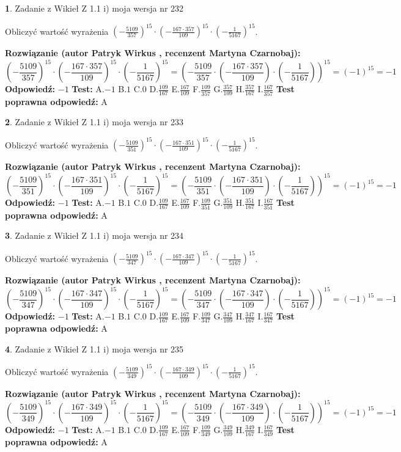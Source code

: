 \documentclass[12pt, a4paper]{article}
\theoremstyle{definition} %
\newtheorem{zad}{}
\newcommand{\zadStart}[1]{\begin{zad}#1\newline}
\newcommand{\zadStop}{\end{zad}}
\newcommand{\rozwStart}[2]{\noindent \textbf{Rozwiązanie (autor #1 , recenzent #2): }\newline}
\newcommand{\rozwStop}{\newline}
\newcommand{\odpStart}{\noindent \textbf{Odpowiedź:}\newline}
\newcommand{\odpStop}{\newline}
\newcommand{\testStart}{\noindent \textbf{Test:}\newline}
\newcommand{\testStop}{\newline}
\newcommand{\kluczStart}{\noindent \textbf{Test poprawna odpowiedź:}\newline}
\newcommand{\kluczStop}{\newline}
\begin{document}
\zadStart{Zadanie z Wikieł Z 1.1 i) moja wersja nr 232}

Obliczyć wartość wyrażenia $(-\frac{5109}{357})^{15} \cdot (-\frac{167 \cdot 357}{109})^{15} \cdot (-\frac{1}{5167})^{15}$.
\zadStop
\rozwStart{Patryk Wirkus}{Martyna Czarnobaj}
$$(-\frac{5109}{357})^{15} \cdot (-\frac{167 \cdot 357}{109})^{15} \cdot (-\frac{1}{5167})^{15} = (-\frac{5109}{357} \cdot (-\frac{167 \cdot 357}{109}) \cdot (-\frac{1}{5167}))^{15} = (-1)^{15} = -1$$
\rozwStop
\odpStart
$-1$
\odpStop
\testStart
A.$-1$ B.$1$ C.$0$ D.$\frac{109}{167}$ E.$\frac{167}{109}$
F.$\frac{109}{357}$ G.$\frac{357}{109}$
H.$\frac{357}{167}$
I.$\frac{167}{357}$
\testStop
\kluczStart
A
\kluczStop



\zadStart{Zadanie z Wikieł Z 1.1 i) moja wersja nr 233}

Obliczyć wartość wyrażenia $(-\frac{5109}{351})^{15} \cdot (-\frac{167 \cdot 351}{109})^{15} \cdot (-\frac{1}{5167})^{15}$.
\zadStop
\rozwStart{Patryk Wirkus}{Martyna Czarnobaj}
$$(-\frac{5109}{351})^{15} \cdot (-\frac{167 \cdot 351}{109})^{15} \cdot (-\frac{1}{5167})^{15} = (-\frac{5109}{351} \cdot (-\frac{167 \cdot 351}{109}) \cdot (-\frac{1}{5167}))^{15} = (-1)^{15} = -1$$
\rozwStop
\odpStart
$-1$
\odpStop
\testStart
A.$-1$ B.$1$ C.$0$ D.$\frac{109}{167}$ E.$\frac{167}{109}$
F.$\frac{109}{351}$ G.$\frac{351}{109}$
H.$\frac{351}{167}$
I.$\frac{167}{351}$
\testStop
\kluczStart
A
\kluczStop



\zadStart{Zadanie z Wikieł Z 1.1 i) moja wersja nr 234}

Obliczyć wartość wyrażenia $(-\frac{5109}{347})^{15} \cdot (-\frac{167 \cdot 347}{109})^{15} \cdot (-\frac{1}{5167})^{15}$.
\zadStop
\rozwStart{Patryk Wirkus}{Martyna Czarnobaj}
$$(-\frac{5109}{347})^{15} \cdot (-\frac{167 \cdot 347}{109})^{15} \cdot (-\frac{1}{5167})^{15} = (-\frac{5109}{347} \cdot (-\frac{167 \cdot 347}{109}) \cdot (-\frac{1}{5167}))^{15} = (-1)^{15} = -1$$
\rozwStop
\odpStart
$-1$
\odpStop
\testStart
A.$-1$ B.$1$ C.$0$ D.$\frac{109}{167}$ E.$\frac{167}{109}$
F.$\frac{109}{347}$ G.$\frac{347}{109}$
H.$\frac{347}{167}$
I.$\frac{167}{347}$
\testStop
\kluczStart
A
\kluczStop



\zadStart{Zadanie z Wikieł Z 1.1 i) moja wersja nr 235}

Obliczyć wartość wyrażenia $(-\frac{5109}{349})^{15} \cdot (-\frac{167 \cdot 349}{109})^{15} \cdot (-\frac{1}{5167})^{15}$.
\zadStop
\rozwStart{Patryk Wirkus}{Martyna Czarnobaj}
$$(-\frac{5109}{349})^{15} \cdot (-\frac{167 \cdot 349}{109})^{15} \cdot (-\frac{1}{5167})^{15} = (-\frac{5109}{349} \cdot (-\frac{167 \cdot 349}{109}) \cdot (-\frac{1}{5167}))^{15} = (-1)^{15} = -1$$
\rozwStop
\odpStart
$-1$
\odpStop
\testStart
A.$-1$ B.$1$ C.$0$ D.$\frac{109}{167}$ E.$\frac{167}{109}$
F.$\frac{109}{349}$ G.$\frac{349}{109}$
H.$\frac{349}{167}$
I.$\frac{167}{349}$
\testStop
\kluczStart
A
\kluczStop
\end{document}
